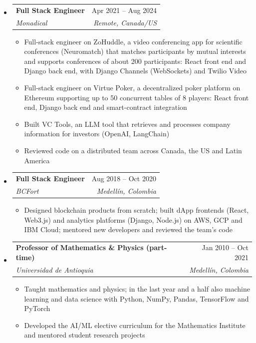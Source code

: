 \documentclass[letterpaper,10pt]{article}
\makeatletter
\newcommand{\resumeSubheading}[4]{
  \vspace{-2pt}
  \item[]
  \begin{tabular*}{\textwidth}{@{\extracolsep{\fill}}l r}
    \textbf{#1} & #2 \\
    \textit{#3} & \textit{#4} \\
  \end{tabular*}
  \vspace{-5pt}
}
\makeatother
\begin{document}
\begin{itemize}[leftmargin=0pt, itemindent=0pt, label={}, itemsep=1pt]
\begin{itemize}[leftmargin=*, itemsep=0pt]
    \item Delivered end-to-end web applications for business clients: React.js/Next.js/TypeScript on the front, Python/FastAPI/Django and Node.js/NestJS behind it, deployed on AWS with CI/CD and Stripe payments
    \item Ran technical design sessions with clients and made the technology decisions for each project; code reviewer for a client's development team
\end{itemize}
\resumeSubheading
{Full Stack Engineer}{Apr 2021 -- Aug 2024}
{Monadical}{Remote, Canada/US}
\begin{itemize}[leftmargin=*, itemsep=0pt]
    \item Full-stack engineer on ZoHuddle, a video conferencing app for scientific conferences (Neuromatch) that matches participants by mutual interests and supports conferences of about 200 participants: React front end and Django back end, with Django Channels (WebSockets) and Twilio Video
    \item Full-stack engineer on Virtue Poker, a decentralized poker platform on Ethereum supporting up to 50 concurrent tables of 8 players: React front end, Django back end and smart-contract integration
    \item Built VC Tools, an LLM tool that retrieves and processes company information for investors (OpenAI, LangChain)
    \item Reviewed code on a distributed team across Canada, the US and Latin America
\end{itemize}
\resumeSubheading
{Full Stack Engineer}{Aug 2018 -- Oct 2020}
{BCFort}{Medell\'in, Colombia}
\begin{itemize}[leftmargin=*, itemsep=0pt]
    \item Designed blockchain products from scratch; built dApp frontends (React, Web3.js) and analytics platforms (Django, Node.js) on AWS, GCP and IBM Cloud; mentored new developers and reviewed the team's code
\end{itemize}
\resumeSubheading
{Professor of Mathematics \& Physics (part-time)}{Jan 2010 -- Oct 2021}
{Universidad de Antioquia}{Medell\'in, Colombia}
\begin{itemize}[leftmargin=*, itemsep=0pt]
    \item Taught mathematics and physics; in the last year and a half also machine learning and data science with Python, NumPy, Pandas, TensorFlow and PyTorch
    \item Developed the AI/ML elective curriculum for the Mathematics Institute and mentored student research projects
\end{itemize}
\end{itemize}
\end{document}
